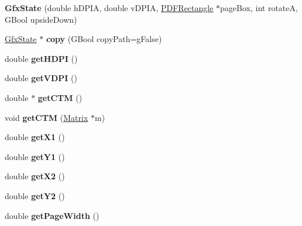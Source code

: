 \begin{DoxyCompactItemize}
\item 
\mbox{\label{class_gfx_state_a7ddaccda2a96be2cdc8d5b59b0952f42}} 
{\bfseries Gfx\+State} (double h\+D\+P\+IA, double v\+D\+P\+IA, \hyperlink{class_p_d_f_rectangle}{P\+D\+F\+Rectangle} $\ast$page\+Box, int rotateA, G\+Bool upside\+Down)
\item 
\mbox{\label{class_gfx_state_a8b1af562b46e8f3df067b009d890a85c}} 
\hyperlink{class_gfx_state}{Gfx\+State} $\ast$ {\bfseries copy} (G\+Bool copy\+Path=g\+False)
\item 
\mbox{\label{class_gfx_state_aa3d4ccb4accaffa2021140830381c8a3}} 
double {\bfseries get\+H\+D\+PI} ()
\item 
\mbox{\label{class_gfx_state_a050968c227ed0ad0521a3bab9fdeef17}} 
double {\bfseries get\+V\+D\+PI} ()
\item 
\mbox{\label{class_gfx_state_af708938179a80b7423e383a5d30c778a}} 
double $\ast$ {\bfseries get\+C\+TM} ()
\item 
\mbox{\label{class_gfx_state_a0e3d90618a3e179ace4b45e601da417e}} 
void {\bfseries get\+C\+TM} (\hyperlink{class_matrix}{Matrix} $\ast$m)
\item 
\mbox{\label{class_gfx_state_a9aa083bd320b4638c8c25d9c6fbfe4a8}} 
double {\bfseries get\+X1} ()
\item 
\mbox{\label{class_gfx_state_a14940a60bef6bbc835da15fe9700e9b9}} 
double {\bfseries get\+Y1} ()
\item 
\mbox{\label{class_gfx_state_adf2aced31c0b7638674927862a46ad7e}} 
double {\bfseries get\+X2} ()
\item 
\mbox{\label{class_gfx_state_afcacb91dab28d0973c18e783eff94d55}} 
double {\bfseries get\+Y2} ()
\item 
\mbox{\label{class_gfx_state_a84960b45cfd914afc34eeebcee0c9c92}} 
double {\bfseries get\+Page\+Width} ()

\end{DoxyCompactItemize}
